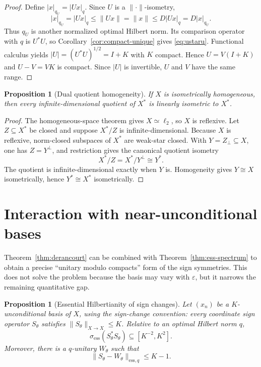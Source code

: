 \documentclass[11pt]{article}
\newtheorem{proposition}[theorem]{Proposition}
\theoremstyle{definition}
\begin{document}
\begin{proof}
Define $|x|_{q_U}=|Ux|_q$.  Since $U$ is a $\|\cdot\|$-isometry,
\[
 |x|_{q_U}=|Ux|_q\leq\|Ux\|=\|x\|
 \leq D|Ux|_q=D|x|_{q_U}.
\]
Thus $q_U$ is another normalized optimal Hilbert norm.  Its comparison
operator with $q$ is $U^*U$, so Corollary~\ref{cor:compact-unique} gives
\eqref{eq:ustaru}.  Functional calculus yields
$|U|=(U^*U)^{1/2}=I+K$ with $K$ compact.  Hence
$U=V(I+K)$ and $U-V=VK$ is compact.  Since $|U|$ is invertible, $U$ and $V$
have the same range.
\end{proof}

\begin{proposition}[Dual quotient homogeneity]\label{prop:dual-quotient}
If $X$ is isometrically homogeneous, then every infinite-dimensional quotient
of $X^*$ is linearly isometric to $X^*$.
\end{proposition}

\begin{proof}
The homogeneous-space theorem gives $X\simeq\ell_2$, so $X$ is reflexive.
Let $Z\subseteq X^*$ be closed and suppose $X^*/Z$ is infinite-dimensional.
Because $X$ is reflexive, norm-closed subspaces of $X^*$ are weak-star closed.
With $Y=Z_\perp\subseteq X$, one has $Z=Y^\perp$, and restriction gives the
canonical quotient isometry
\[
 X^*/Z=X^*/Y^\perp\cong Y^*.
\]
The quotient is infinite-dimensional exactly when $Y$ is.  Homogeneity gives
$Y\cong X$ isometrically, hence $Y^*\cong X^*$ isometrically.
\end{proof}

\section{Interaction with near-unconditional bases}\label{sec:unconditional}

Theorem~\ref{thm:derancourt} can be combined with
Theorem~\ref{thm:ess-spectrum} to obtain a precise ``unitary modulo compacts''
form of the sign symmetries.  This does not solve the problem because the basis
may vary with $\varepsilon$, but it narrows the remaining quantitative gap.

\begin{proposition}[Essential Hilbertianity of sign changes]
\label{prop:signs}
Let $(x_n)$ be a $K$-unconditional basis of $X$, using the sign-change
convention: every coordinate sign operator $S_\theta$ satisfies
$\|S_\theta\|_{X\to X}\leq K$.  Relative to an optimal Hilbert norm $q$,
\begin{equation}\label{eq:sign-spectrum}
 \sigma_{\mathrm{ess}}(S_\theta^*S_\theta)
 \subseteq[K^{-2},K^2].
\end{equation}
Moreover, there is a $q$-unitary $W_\theta$ such that
\begin{equation}\label{eq:essential-distance}
 \|S_\theta-W_\theta\|_{\mathrm{ess},q}\leq K-1.
\end{equation}
\end{proposition}
\end{document}

